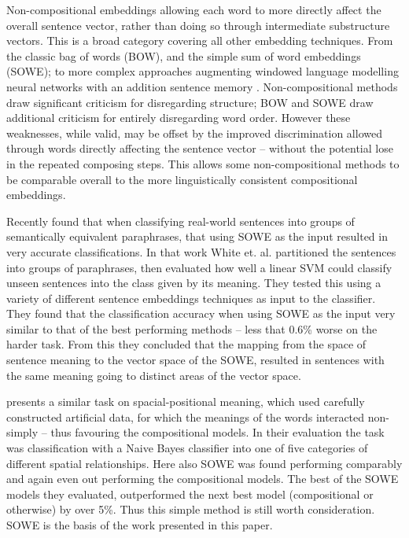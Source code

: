 \documentclass[11pt]{article}
\theoremstyle{plain}
\theoremstyle{definition}
\begin{document}

Non-compositional embeddings allowing each word to more directly affect the overall sentence vector, rather than doing so through intermediate substructure vectors. This is a broad category covering all other embedding techniques. From the classic bag of words (BOW), and the simple sum of word embeddings (SOWE); to more complex approaches augmenting windowed language modelling neural networks with an addition sentence memory \parencite{le2014distributed}.  Non-compositional methods draw significant criticism for disregarding structure; BOW and SOWE draw additional criticism for entirely disregarding word order. However these weaknesses, while valid, may be offset by the improved discrimination allowed through words directly affecting the sentence vector -- without the potential lose in the repeated composing steps. This allows some non-compositional methods to be comparable overall to the more linguistically consistent compositional embeddings. 


Recently \textcite{White2015SentVecMeaning} found that when classifying real-world sentences into groups of semantically equivalent paraphrases, that using SOWE as the input resulted in very accurate classifications. In that work White et. al. partitioned the sentences into groups of paraphrases, then evaluated how well a linear SVM could classify unseen sentences into the class given by its meaning. They tested this using a variety of different sentence embeddings techniques as input to the classifier. They found that the classification accuracy when using SOWE as the input very similar to that of the best performing methods -- less that 0.6\% worse on the harder task. From this they concluded that the mapping from the space of sentence meaning to the vector space of the SOWE, resulted in sentences with the same meaning going to distinct areas of the vector space.

\textcite{RitterPosition} presents a similar task on spacial-positional meaning, which used carefully constructed artificial data, for which the meanings of the words interacted non-simply -- thus favouring the compositional models. In their evaluation the task was classification with a Naive Bayes classifier into one of five categories of different spatial relationships. Here also SOWE was found performing comparably and again even out performing the compositional models. The best of the SOWE models they evaluated, outperformed the next best model (compositional or otherwise) by over 5\%. Thus this simple method is still worth consideration. SOWE is the basis of the work presented in this paper.
\end{document}
